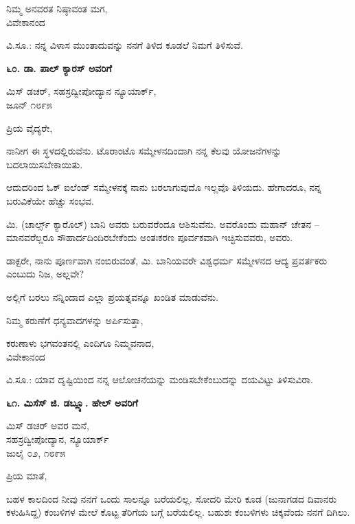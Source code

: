 \begin{flushright}
ನಿಮ್ಮ ಅನವರತ ನಿಷ್ಠಾವಂತ ಮಗ,\\ವಿವೇಕಾನಂದ
\end{flushright}

ವಿ.ಸೂ.: ನನ್ನ ವಿಳಾಸ ಮುಂತಾದುವನ್ನು ನನಗೆ ತಿಳಿದ ಕೂಡಲೆ ನಿಮಗೆ ತಿಳಿಸುವೆ.

\begin{center}
\textbf{೬೦. ಡಾ. ಪಾಲ್ ಕ್ಯಾರಸ್ ಅವರಿಗೆ}
\end{center}

\begin{flushright}
 ಮಿಸ್ ಡಚರ್, ಸಹಸ್ರದ್ವೀಪೋದ್ಯಾನ ನ್ಯೂಯಾರ್ಕ್,\\ಜೂನ್ ೧೮೯೫
\end{flushright}

ಪ್ರಿಯ ವೈದ್ಯರೇ,

ನಾನೀಗ ಈ ಸ್ಥಳದಲ್ಲಿರುವೆನು. ಟೊರಾಂಟೊ ಸಮ್ಮೇಳನದಿಂದಾಗಿ ನನ್ನ ಕೆಲವು ಯೋಜನೆಗಳನ್ನು ಬದಲಾಯಿಸಬೇಕಾಯಿತು.

ಆದುದರಿಂದ ಓಕ್ ಐಲೆಂಡ್ ಸಮ್ಮೇಳನಕ್ಕೆ ನಾನು ಬರಲಾಗುವುದೊ ಇಲ್ಲವೊ ತಿಳಿಯದು. ಹೇಗಾದರೂ, ನನ್ನ ಬರುವಿಕೆಯೇ ಹೆಚ್ಚು ಸಂಭವ.

ಮಿ. (ಚಾರ್ಲ್ಸ್ ಕ್ಯಾರೊಲ್) ಬಾನಿ ಅವರು ಬರುವರೆಂದೂ ಆಶಿಸುವೆನು. ಅವರೊಂದು ಮಹಾನ್ ಚೇತನ – ಮಾನವರೆಲ್ಲರೂ ಸೌಹಾರ್ದದಿಂದಿರಬೇಕೆಂದು ಅಂತಃಕರಣ ಪೂರ್ವಕವಾಗಿ ಇಚ್ಛಿಸುವವರು, ಅವರು.

ಡಾಕ್ಟರೇ, ನಾನು ಪೂರ್ಣವಾಗಿ ನಂಬಿರುವಂತೆ, ಮಿ. ಬಾನಿಯವರೇ ವಿಶ್ವಧರ್ಮ ಸಮ್ಮೇಳನದ ಆದ್ಯ ಪ್ರವರ್ತಕರು ಎಂಬುದು ನಿಜ, ಅಲ್ಲವೇ?

ಅಲ್ಲಿಗೆ ಬರಲು ನನ್ನಿಂದಾದ ಎಲ್ಲಾ ಪ್ರಯತ್ನವನ್ನೂ ಖಂಡಿತ ಮಾಡುವೆನು.

ನಿಮ್ಮ ಕರುಣೆಗೆ ಧನ್ಯವಾದಗಳನ್ನು ಅರ್ಪಿಸುತ್ತಾ,

\begin{flushright}
ಕರುಣಾಳು ಭಗವಂತನಲ್ಲಿ ಎಂದಿಗೂ ನಿಮ್ಮವನಾದ,\\ವಿವೇಕಾನಂದ
\end{flushright}

ವಿ.ಸೂ.: ಯಾವ ದೃಷ್ಟಿಯಿಂದ ನನ್ನ ಆಲೋಚನೆಯನ್ನು ಮಂಡಿಸಬೇಕೆಂಬುದನ್ನು ದಯವಿಟ್ಟು ತಿಳಿಸುವಿರಾ.

\begin{center}
\textbf{೬೧. ಮಿಸೆಸ್ ಜಿ. ಡಬ್ಲ್ಯೂ. ಹೇಲ್ ಅವರಿಗೆ}
\end{center}

\begin{flushright}
 ಮಿಸ್ ಡಚರ್ ಅವರ ಮನೆ,\\ಸಹಸ್ರದ್ವೀಪೋದ್ಯಾನ, ನ್ಯೂಯಾರ್ಕ್\\ಜುಲೈ ೦೨, ೧೮೯೫
\end{flushright}

ಪ್ರಿಯ ಮಾತೆ,

ಬಹಳ ಕಾಲದಿಂದ ನೀವು ನನಗೆ ಒಂದು ಸಾಲನ್ನೂ ಬರೆಯಲಿಲ್ಲ. ಸೋದರಿ ಮೇರಿ ಕೂಡ (ಜುನಾಗಡದ ದಿವಾನರು ಕಳುಹಿಸಿದ್ದ) ಕಂಬಳಿಗಳ ಮೇಲೆ ಕೊಟ್ಟ ತೆರಿಗೆಯ ಬಗ್ಗೆ ಬರೆಯಲಿಲ್ಲ. ಬಹುಶಃ ಕಂಬಳಿಗಳು ಚಿಕ್ಕವೆಂದು ನನಗೆ ದಿಗಿಲು.

